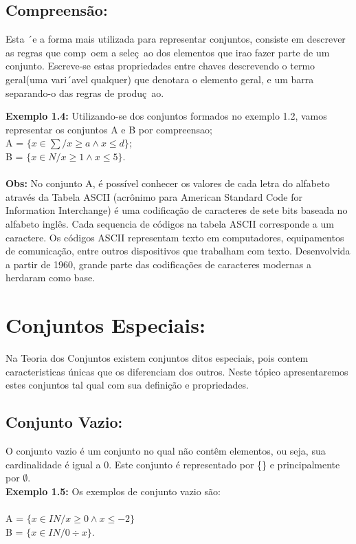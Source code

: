 \documentclass[a4paper,12pt,twoside,BCOR=10mm]{scrbook}
\begin{document}
\begin{titlepage}
\subsection{Compreensão:}
Esta ´e a forma mais utilizada para representar conjuntos, consiste em descrever as regras que comp~oem a seleç~ao dos elementos que irao fazer parte de um conjunto. Escreve-se estas propriedades entre chaves descrevendo o termo geral(uma vari´avel qualquer) que denotara o elemento geral, e um barra separando-o das regras de produç~ao.

\textbf{Exemplo 1.4:} Utilizando-se dos conjuntos formados no exemplo 1.2, vamos representar os conjuntos A e B por compreensao;\\
A = $\{x \in \sum / x \geq a \wedge x \leq d\}$;\\
B = $\{x \in N / x \geq 1 \wedge x \leq 5\}.$\\ \\
\textbf{Obs:} No conjunto A, é possível conhecer os valores de cada letra do alfabeto através da Tabela ASCII (acrônimo para American Standard Code for Information Interchange) é uma codificação de caracteres de sete bits baseada no alfabeto inglês. Cada sequencia de códigos na tabela ASCII corresponde a um caractere.  Os códigos ASCII representam texto em computadores, equipamentos de comunicação, entre outros dispositivos que trabalham com texto. Desenvolvida a partir de 1960, grande parte das codificações de caracteres modernas a herdaram como base.

\section{Conjuntos Especiais:}
Na Teoria dos Conjuntos existem conjuntos ditos especiais, pois contem caracteristicas únicas que os diferenciam dos outros. Neste tópico apresentaremos estes conjuntos tal qual com sua definição e propriedades.
\subsection{Conjunto Vazio:}
O conjunto vazio é um conjunto no qual não contêm elementos, ou seja, sua cardinalidade é igual a 0. Este conjunto é representado por \{\} e principalmente por $\emptyset$.\\
\textbf{Exemplo 1.5:} Os exemplos de conjunto vazio são:\\ \\
A = $\{x \in IN / x \geq 0 \wedge x \leq -2 \}$\\
B = $\{x \in IN /  0 \div x \}$.
\\

\end{titlepage}
\end{document}
